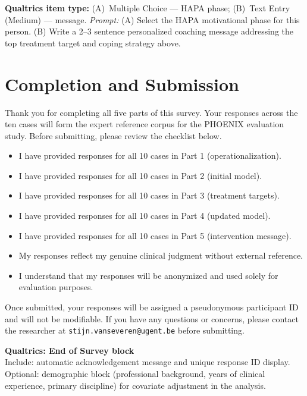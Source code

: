 \documentclass[11pt,a4paper]{article}
\newcommand{\haparesponse}[1]{\begin{tcolorbox}[colback=ResponseBG,colframe=GoldAmber,boxrule=0.6pt,arc=1.5mm,left=6pt,right=6pt,top=5pt,bottom=5pt]\small\textbf{\color{GoldAmber}Qualtrics item type:} (A)~Multiple Choice --- HAPA phase; (B)~Text Entry (Medium) --- message. \quad \textit{Prompt:} #1\end{tcolorbox}}
\begin{document}
\haparesponse{(A) Select the HAPA motivational phase for this person. (B) Write a 2--3 sentence personalized coaching message addressing the top treatment target and coping strategy above.}

\newpage

\section{Completion and Submission}

Thank you for completing all five parts of this survey. Your responses across the ten cases will form the expert reference corpus for the PHOENIX evaluation study. Before submitting, please review the checklist below.

\begin{instrbox}[title=Pre-submission checklist]
\begin{itemize}
\item[$\square$] I have provided responses for all 10 cases in Part 1 (operationalization).
\item[$\square$] I have provided responses for all 10 cases in Part 2 (initial model).
\item[$\square$] I have provided responses for all 10 cases in Part 3 (treatment targets).
\item[$\square$] I have provided responses for all 10 cases in Part 4 (updated model).
\item[$\square$] I have provided responses for all 10 cases in Part 5 (intervention message).
\item[$\square$] My responses reflect my genuine clinical judgment without external reference.
\item[$\square$] I understand that my responses will be anonymized and used solely for evaluation purposes.
\end{itemize}
\end{instrbox}

\medskip
Once submitted, your responses will be assigned a pseudonymous participant ID and will not be modifiable. If you have any questions or concerns, please contact the researcher at \texttt{stijn.vanseveren@ugent.be} before submitting.

\vspace{0.8em}

\begin{tcolorbox}[colback=AccentBlue,colframe=PrimaryBlue,arc=2mm,boxrule=0.6pt,left=8pt,right=8pt,top=7pt,bottom=7pt]
\small\centering
\textbf{Qualtrics: End of Survey block}\\
Include: automatic acknowledgement message and unique response ID display.\\
Optional: demographic block (professional background, years of clinical experience, primary discipline) for covariate adjustment in the analysis.
\end{tcolorbox}
\end{document}
